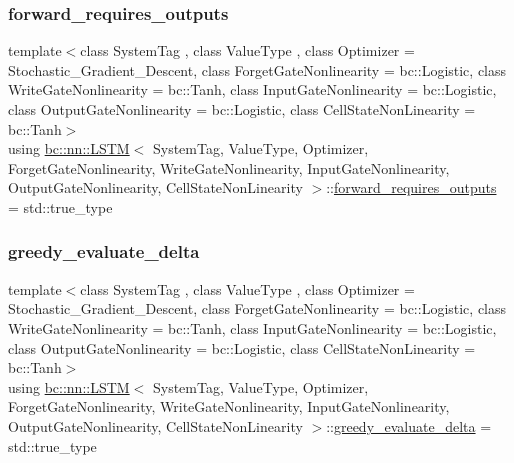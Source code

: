 \mbox{\label{structbc_1_1nn_1_1LSTM_a0ed3ef008dd514399c0ad36e2093a47f}} 
\subsubsection{\texorpdfstring{forward\+\_\+requires\+\_\+outputs}{forward\_requires\_outputs}}
{\footnotesize\ttfamily template$<$class System\+Tag , class Value\+Type , class Optimizer  = Stochastic\+\_\+\+Gradient\+\_\+\+Descent, class Forget\+Gate\+Nonlinearity  = bc\+::\+Logistic, class Write\+Gate\+Nonlinearity  = bc\+::\+Tanh, class Input\+Gate\+Nonlinearity  = bc\+::\+Logistic, class Output\+Gate\+Nonlinearity  = bc\+::\+Logistic, class Cell\+State\+Non\+Linearity  = bc\+::\+Tanh$>$ \\
using \hyperlink{structbc_1_1nn_1_1LSTM}{bc\+::nn\+::\+L\+S\+TM}$<$ System\+Tag, Value\+Type, Optimizer, Forget\+Gate\+Nonlinearity, Write\+Gate\+Nonlinearity, Input\+Gate\+Nonlinearity, Output\+Gate\+Nonlinearity, Cell\+State\+Non\+Linearity $>$\+::\hyperlink{structbc_1_1nn_1_1LSTM_a0ed3ef008dd514399c0ad36e2093a47f}{forward\+\_\+requires\+\_\+outputs} =  std\+::true\+\_\+type}

\mbox{\label{structbc_1_1nn_1_1LSTM_aa147016269d4e28e85e6ecfa224be9e0}} 
\subsubsection{\texorpdfstring{greedy\+\_\+evaluate\+\_\+delta}{greedy\_evaluate\_delta}}
{\footnotesize\ttfamily template$<$class System\+Tag , class Value\+Type , class Optimizer  = Stochastic\+\_\+\+Gradient\+\_\+\+Descent, class Forget\+Gate\+Nonlinearity  = bc\+::\+Logistic, class Write\+Gate\+Nonlinearity  = bc\+::\+Tanh, class Input\+Gate\+Nonlinearity  = bc\+::\+Logistic, class Output\+Gate\+Nonlinearity  = bc\+::\+Logistic, class Cell\+State\+Non\+Linearity  = bc\+::\+Tanh$>$ \\
using \hyperlink{structbc_1_1nn_1_1LSTM}{bc\+::nn\+::\+L\+S\+TM}$<$ System\+Tag, Value\+Type, Optimizer, Forget\+Gate\+Nonlinearity, Write\+Gate\+Nonlinearity, Input\+Gate\+Nonlinearity, Output\+Gate\+Nonlinearity, Cell\+State\+Non\+Linearity $>$\+::\hyperlink{structbc_1_1nn_1_1LSTM_aa147016269d4e28e85e6ecfa224be9e0}{greedy\+\_\+evaluate\+\_\+delta} =  std\+::true\+\_\+type}

